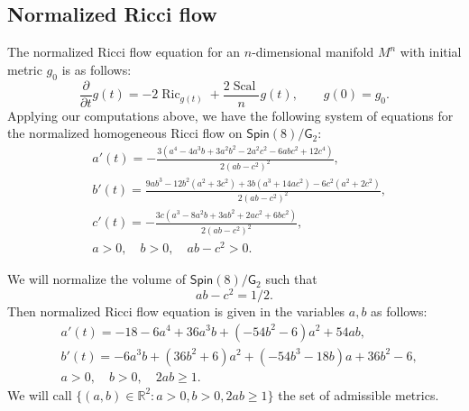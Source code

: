 \documentclass{amsart}
\numberwithin{equation}{section}
\theoremstyle{plain}
\theoremstyle{definition}
\theoremstyle{remark}
\numberwithin{table}{section}
\DeclareMathOperator{\Ric}{Ric}
\DeclareMathOperator{\Scal}{Scal}
\newcommand{\gG}{\mathsf{G}}
\newcommand{\Spin}{\mathsf{Spin}}
\newcommand{\bR}{\mathbb{R}}
\begin{document}
\subsection{Normalized Ricci flow}
    The normalized Ricci flow equation for an $n$-dimensional manifold $M^n$ with initial metric $g_0$ is as follows:
    \[
        \frac{\partial}{\partial t} g(t) = -2 \Ric_{g(t)} + \frac{2 \Scal}{n} g(t), \qquad g(0)=g_0.
    \]
        Applying our computations above, we have the following system of equations for the normalized homogeneous Ricci flow on $\Spin(8)/\gG_2$:
        \begin{align*}
            &
            a'(t)=-\frac{3(a^4 - 4 a^3 b + 3 a^2 b^2 - 2 a^2 c^2 - 6 a b c^2 + 12 c^4)}{2 (a b - c^2)^2},\\
            &
            b'(t)=\frac{9 a b^3 - 12 b^2 ( a^2 + 3 c^2)  + 3 b (a^3 + 14 a c^2) - 6 c^2 (a^2 + 2 c^2)}{2 (a b - c^2)^2},\\
            &
            c'(t)=-\frac{3c (a^3 - 8 a^2 b + 3 a b^2 + 2 a c^2 + 6 b c^2)}{2 (a b - c^2)^2},\\
            & 
            a>0, \quad b>0, \quad ab-c^2>0.
        \end{align*}
    
    We will normalize the volume of $\Spin(8)/\gG_2$ such that 
    \begin{equation}\label{eq:volume_normalization}
        ab-c^2 = 1/2.
    \end{equation}
    Then normalized Ricci flow equation is given in the variables $a,b$ as follows:
    \begin{equation}\label{eq:sys_ab}
    \begin{aligned}
        &
        a'(t) = -18 - 6 a^4 + 36 a^3 b + (-54 b^2 - 6) a^2 + 54 a b,  \\
        &
        b'(t) = -6 a^3 b + (36 b^2 + 6) a^2 + (-54 b^3 - 18 b) a + 36 b^2 - 6,  \\
        &
        a>0, \quad b>0, \quad 2ab \geq 1.
    \end{aligned}
    \end{equation}
    We will call $\{(a,b)\in\bR^2:a>0,b>0,2ab\geq 1\}$ the set of admissible metrics.
\end{document}
